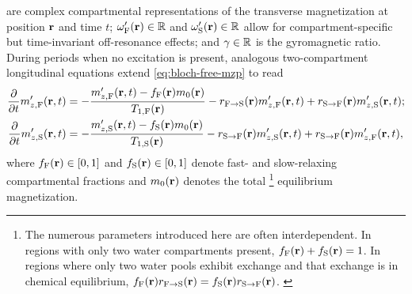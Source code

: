 are complex compartmental representations
of the transverse magnetization
at position $\mathbf{r}$ 
and time $t$; 
$\ompf\pr \in \real$ and $\omps\pr \in \real$ 
allow for compartment-specific 
but time-invariant off-resonance effects;
and $\gamma \in \mathbb{R}$ is the gyromagnetic ratio.
During periods when no excitation is present,
analogous two-compartment longitudinal equations 
extend \eqref{eq:bloch-free-mzp} to read
\begin{align}
	\dela{t} \mzpf\prt &=
		-\frac{\mzpf\prt - \ff\pr\mzero\pr}{\tf{1}\pr} 
		- \rfs\pr \mzpf\prt + \rsf\pr \mzps\prt;
		\label{eq:mwf,mz-f} \\
	\dela{t} \mzps\prt &= 
		-\frac{\mzps\prt - \fs\pr\mzero\pr}{\ts{1}\pr}
		- \rsf\pr \mzps\prt + \rsf\pr \mzpf\prt,
		\label{eq:mwf,mz-s}
\end{align}
where $\ff\pr \in \brac{0,1}$ and $\fs\pr \in \brac{0,1}$ 
denote fast- and slow-relaxing
compartmental fractions
and $\mzero\pr$ denotes the total 
\footnote{%
	The numerous parameters introduced here
	are often interdependent. 
	In regions with only two water compartments present,
	$\ff\pr + \fs\pr = 1$.
	In regions where only two water pools exhibit exchange 
	and that exchange is in chemical equilibrium,
	$\ff\pr \rfs\pr = \fs\pr \rsf\pr$.
	\label{foot:constraint}
}
equilibrium magnetization.
 
